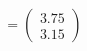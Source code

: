 \documentclass[preview]{standalone}
\begin{document}
\begin{align*}
= \begin{pmatrix} 3.75 \\ 3.15 \end{pmatrix}
\end{align*}
\end{document}
